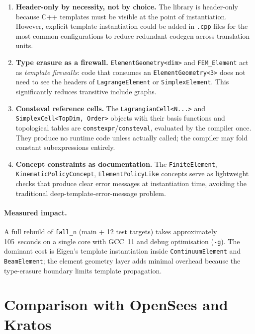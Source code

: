 \begin{enumerate}[nosep]
  \item \textbf{Header-only by necessity, not by choice.}  The library is
        header-only because C++ templates must be visible at the point of
        instantiation.  However, explicit template instantiation could be
        added in \texttt{.cpp} files for the most common configurations to
        reduce redundant codegen across translation units.

  \item \textbf{Type erasure as a firewall.}  \texttt{ElementGeometry<dim>}
        and \texttt{FEM\_Element} act as \emph{template firewalls}: code that
        consumes an \texttt{ElementGeometry<3>} does not need to see the
        headers of \texttt{LagrangeElement} or \texttt{SimplexElement}.
        This significantly reduces transitive include graphs.

  \item \textbf{Consteval reference cells.}  The \texttt{LagrangianCell<N...>}
        and \texttt{SimplexCell<TopDim, Order>} objects with their basis
        functions and topological tables are \texttt{constexpr}/\texttt{consteval},
        evaluated by the compiler once.  They produce no runtime code unless
        actually called; the compiler may fold constant subexpressions entirely.

  \item \textbf{Concept constraints as documentation.}  The
        \texttt{FiniteElement}, \texttt{KinematicPolicyConcept},
        \texttt{ElementPolicyLike} concepts serve as lightweight checks that
        produce clear error messages at instantiation time, avoiding the
        traditional deep-template-error-message problem.
\end{enumerate}

\paragraph{Measured impact.}
A full rebuild of \texttt{fall\_n} (main + 12 test targets) takes approximately
105~seconds on a single core with GCC~11 and debug optimisation (\texttt{-g}).
The dominant cost is Eigen's template instantiation inside
\texttt{ContinuumElement} and \texttt{BeamElement}; the element geometry layer
adds minimal overhead because the type-erasure boundary limits template
propagation.


\section{Comparison with OpenSees and Kratos}
\label{sec:comparison}

